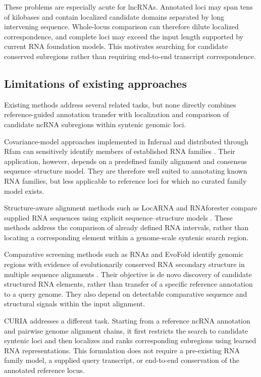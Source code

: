 These problems are especially acute for lncRNAs. Annotated loci may span tens of
kilobases and contain localized candidate domains separated by long intervening
sequence. Whole-locus comparison can therefore dilute localized correspondence,
and complete loci may exceed the input length supported by current RNA
foundation models. This motivates searching for candidate conserved subregions
rather than requiring end-to-end transcript correspondence.

\subsection{Limitations of existing approaches}

Existing methods address several related tasks, but none directly combines
reference-guided annotation transfer with localization and comparison of
candidate ncRNA subregions within syntenic genomic loci.

Covariance-model approaches implemented in Infernal and distributed through
Rfam can sensitively identify members of established RNA families
\citep{nawrockiInfernal11100fold2013,
  ontiveros-palaciosRfam15RNA2025}. Their application, however, depends on a
predefined family alignment and consensus sequence--structure model. They are
therefore well suited to annotating known RNA families, but less applicable to
reference loci for which no curated family model exists.

Structure-aware alignment methods such as LocARNA and RNAforester compare
supplied RNA sequences using explicit sequence--structure models
\citep{willLocARNA20Versatile2024,hochsmannLocalSimilarityRNA2003}. These methods
address the comparison of already defined RNA intervals, rather than locating a
corresponding element within a genome-scale syntenic search region.

Comparative screening methods such as RNAz and EvoFold identify genomic regions
with evidence of evolutionarily conserved RNA secondary structure in multiple
sequence alignments
\citep{gruberRNAz20Improved2010,pedersenIdentificationClassificationConserved2006}. Their objective is de novo
discovery of candidate structured RNA elements, rather than transfer of a
specific reference annotation to a query genome. They also depend on detectable
comparative sequence and structural signals within the input alignment.

CURIA addresses a different task. Starting from a reference ncRNA annotation and
pairwise genome alignment chains, it first restricts the search to candidate
syntenic loci and then localizes and ranks corresponding subregions using learned
RNA representations. This formulation does not require a pre-existing RNA family
model, a supplied query transcript, or end-to-end conservation of the annotated
reference locus.

